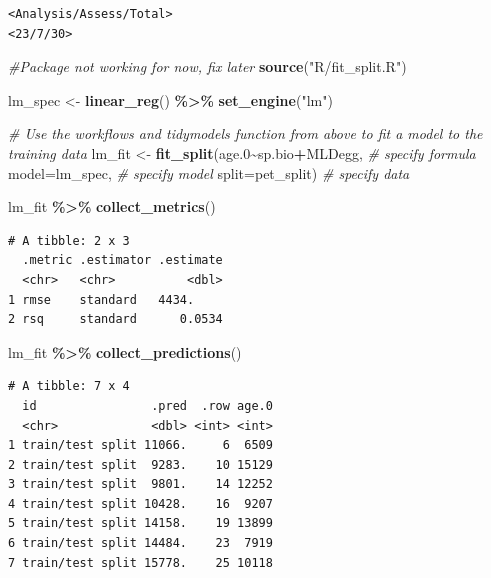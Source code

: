 \documentclass[
]{article}
\newenvironment{Shaded}{\begin{snugshade}}{\end{snugshade}}
\newcommand{\CommentTok}[1]{\textcolor[rgb]{0.56,0.35,0.01}{\textit{#1}}}
\newcommand{\DataTypeTok}[1]{\textcolor[rgb]{0.13,0.29,0.53}{#1}}
\newcommand{\FloatTok}[1]{\textcolor[rgb]{0.00,0.00,0.81}{#1}}
\newcommand{\KeywordTok}[1]{\textcolor[rgb]{0.13,0.29,0.53}{\textbf{#1}}}
\newcommand{\NormalTok}[1]{#1}
\newcommand{\OperatorTok}[1]{\textcolor[rgb]{0.81,0.36,0.00}{\textbf{#1}}}
\newcommand{\StringTok}[1]{\textcolor[rgb]{0.31,0.60,0.02}{#1}}
\begin{document}
\begin{verbatim}
<Analysis/Assess/Total>
<23/7/30>
\end{verbatim}

\begin{Shaded}
\begin{Highlighting}[]
\CommentTok{\#Package not working for now, fix later}
\KeywordTok{source}\NormalTok{(}\StringTok{"R/fit\_split.R"}\NormalTok{)}

\NormalTok{lm\_spec <{-}}\StringTok{ }\KeywordTok{linear\_reg}\NormalTok{() }\OperatorTok{\%>\%}\StringTok{ }
\StringTok{  }\KeywordTok{set\_engine}\NormalTok{(}\StringTok{"lm"}\NormalTok{)}

\CommentTok{\#  Use the workflows and tidymodels function from above to fit a model to the training data}
\NormalTok{lm\_fit <{-}}\StringTok{ }\KeywordTok{fit\_split}\NormalTok{(age}\FloatTok{.0}\OperatorTok{\textasciitilde{}}\NormalTok{sp.bio}\OperatorTok{+}\NormalTok{MLDegg, }\CommentTok{\# specify formula}
                    \DataTypeTok{model=}\NormalTok{lm\_spec, }\CommentTok{\# specify model}
                    \DataTypeTok{split=}\NormalTok{pet\_split) }\CommentTok{\# specify data}

\NormalTok{lm\_fit }\OperatorTok{\%>\%}\StringTok{ }
\StringTok{  }\KeywordTok{collect\_metrics}\NormalTok{()}
\end{Highlighting}
\end{Shaded}

\begin{verbatim}
# A tibble: 2 x 3
  .metric .estimator .estimate
  <chr>   <chr>          <dbl>
1 rmse    standard   4434.    
2 rsq     standard      0.0534
\end{verbatim}

\begin{Shaded}
\begin{Highlighting}[]
\NormalTok{lm\_fit }\OperatorTok{\%>\%}
\StringTok{  }\KeywordTok{collect\_predictions}\NormalTok{()}
\end{Highlighting}
\end{Shaded}

\begin{verbatim}
# A tibble: 7 x 4
  id                .pred  .row age.0
  <chr>             <dbl> <int> <int>
1 train/test split 11066.     6  6509
2 train/test split  9283.    10 15129
3 train/test split  9801.    14 12252
4 train/test split 10428.    16  9207
5 train/test split 14158.    19 13899
6 train/test split 14484.    23  7919
7 train/test split 15778.    25 10118
\end{verbatim}
\end{document}
